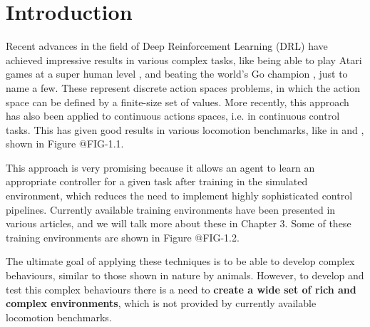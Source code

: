 \chapter{Introduction}
\label{ch:intro}



Recent advances in the field of Deep Reinforcement Learning (DRL) have achieved impressive
results in various complex tasks, like being able to play Atari games at a super human level \citep{DQNAtari}, 
and beating the world's Go champion \citep{AlphaGo}, just to name a few. These represent discrete 
action spaces problems, in which the action space can be defined by a finite-size set of values. 
More recently, this approach has also been applied to continuous actions spaces, i.e. in continuous 
control tasks. This has given good results in various locomotion benchmarks, like in 
\citeauthor{DeepmindEmergenceLocomotion} and \citeauthor{DeepMimic}, shown in Figure @FIG-1.1.

\figDrlLocomotionMotivation

This approach is very promising because it allows an agent to learn an appropriate controller for a given task after training in
the simulated environment, which reduces the need to implement highly sophisticated control pipelines. Currently available 
training environments have been presented in various articles, and we will talk more about these in Chapter 3.
Some of these training environments are shown in Figure @FIG-1.2.


The ultimate goal of applying these techniques is to be able to develop complex behaviours, similar
to those shown in nature by animals. However, to develop and test this complex behaviours there is a need to \textbf{create
a wide set of rich and complex environments}, which is not provided by currently available locomotion benchmarks.

